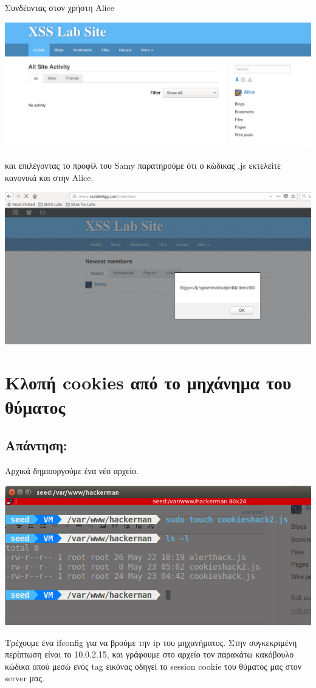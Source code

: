 \noindent
Συνδέοντας στον χρήστη Alice
\begin{center}
			\includegraphics[width=1\textwidth]{image/2.5.PNG}		
\end{center}

\noindent
και επιλέγοντας το προφίλ του Samy παρατηρούμε ότι ο κώδικας .js
εκτελείτε κανονικά και στην Alice.
\begin{center}
			\includegraphics[width=1\textwidth]{image/2.6.PNG}		
\end{center}

\section{Κλοπή cookies από το μηχάνημα του θύματος}
\subsection*{Απάντηση:}

\noindent
Αρχικά δημιουργούμε ένα νέο αρχείο.
\begin{center}
			\includegraphics[width=1\textwidth]{image/3.1.PNG}		
\end{center}
\noindent
Τρέχουμε ένα ifconfig για να βρούμε την ip του μηχανήματος.
Στην συγκεκριμένη περίπτωση είναι το 10.0.2.15, και γράφουμε στο αρχείο
τον παρακάτω κακόβουλο κώδικα οπού μεσώ ενός tag εικόνας οδηγεί το session
cookie του θύματος μας στον server μας. 

